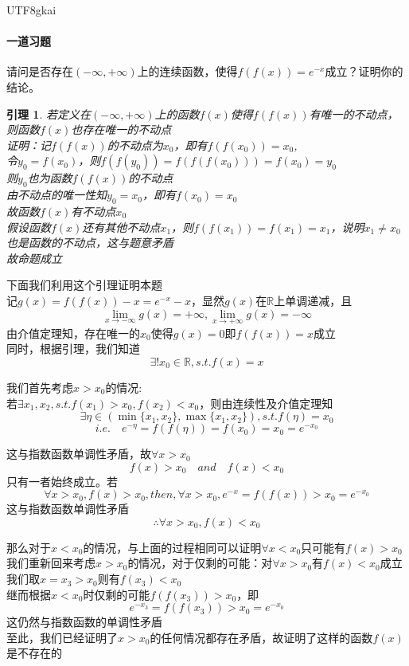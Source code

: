 \documentclass{article}
\newtheorem{lemma}{引理}[subsection]
\begin{document}
\begin{CJK}{UTF8}{gkai}
\paragraph{一道习题\\}
请问是否存在$(-\infty,+\infty)$上的连续函数，使得$f(f(x))=e^{-x}$成立？证明你的结论。\\
\begin{lemma}
若定义在$(-\infty,+\infty)$上的函数$f(x)$使得$f(f(x))$有唯一的不动点，则函数$f(x)$也存在唯一的不动点\\
证明：记$f(f(x))$的不动点为$x_0$，即有$f(f(x_0))=x_0$,\\
令$y_0=f(x_0)$，则$f(f(y_0))=f(f(f(x_0)))=f(x_0)=y_0$\\
则$y_0$也为函数$f(f(x))$的不动点\\
由不动点的唯一性知$y_0=x_0$，即有$f(x_0)=x_0$\\
故函数$f(x)$有不动点$x_0$\\
假设函数$f(x)$还有其他不动点$x_1$，则$f(f(x_1))=f(x_1)=x_1$，说明$x_1\neq x_0 $也是函数的不动点，这与题意矛盾\\
故命题成立\\
\end{lemma}
下面我们利用这个引理证明本题\\

记$g(x)=f(f(x))-x=e^{-x}-x$，显然$g(x)$在$\mathbb{R}$上单调递减，且
\[\lim_{x\to -\infty}g(x)=+\infty,\lim_{x\to +\infty}g(x)=-\infty\]
由介值定理知，存在唯一的$x_0$使得$g(x)=0$即$f(f(x))=x$成立\\
同时，根据引理，我们知道
\[\exists ! x_0 \in\mathbb{R},s.t. f(x)=x\]

我们首先考虑$x>x_0$的情况:\\
若$\exists x_1,x_2,s.t.f(x_1)>x_0,f(x_2)<x_0$，则由连续性及介值定理知
\[\exists \eta\in(\min\{x_1,x_2\},\max\{x_1,x_2\}),s.t. f(\eta)=x_0\]\[i.e.\quad e^{-\eta}=f(f(\eta))=f(x_0)=x_0=e^{-x_0}\]

这与指数函数单调性矛盾，故$\forall x>x_0$
\[f(x)>x_0\quad and \quad f(x)<x_0\]
只有一者始终成立。若
\[\forall x>x_0,f(x)>x_0,then,\forall x>x_0,e^{-x}=f(f(x))>x_0=e^{-x_0}\]
这与指数函数单调性矛盾\\
\[\therefore\forall x>x_0,f(x)<x_0\]

那么对于$x<x_0$的情况，与上面的过程相同可以证明$\forall x<x_0$只可能有$f(x)>x_0$\\

我们重新回来考虑$x>x_0$的情况，对于仅剩的可能：对$\forall x>x_0$有$f(x)<x_0$成立\\
我们取$x=x_3>x_0$则有$f(x_3)<x_0$\\
继而根据$x<x_0$时仅剩的可能$f(f(x_3))>x_0$，即
\[e^{-x_3}=f(f(x_3))>x_0=e^{-x_0}\]
这仍然与指数函数的单调性矛盾\\
至此，我们已经证明了$x>x_0$的任何情况都存在矛盾，故证明了这样的函数$f(x)$是不存在的\\
\newpage

\end{CJK}
\end{document}
